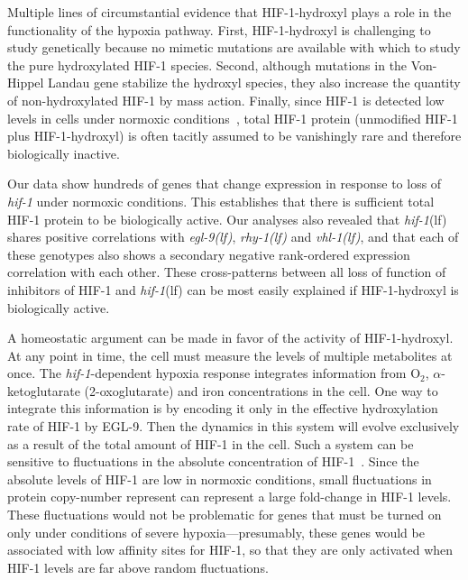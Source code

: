 \documentclass[9pt,twocolumn,twoside]{pnas-new}
\newcommand{\gene}[1]{\emph{#1}}
\newcommand{\egl}{\emph{\mbox{egl-9}(lf)}}
\newcommand{\rhy}{\emph{\mbox{rhy-1}(lf)}}
\newcommand{\vhl}{\emph{\mbox{vhl-1}(lf)}}
\newcommand{\hif}{\emph{\mbox{hif-1}}(lf)}
\newcommand{\eglp}{EGL-9}
\newcommand{\hifp}{HIF-1}
\begin{document}
Multiple lines of circumstantial evidence that \hifp{}-hydroxyl plays a role
in the functionality of the hypoxia pathway. First, \hifp{}-hydroxyl is
challenging to study genetically because no mimetic mutations are available with
which to study the pure hydroxylated \hifp{} species. Second, although mutations in
the Von-Hippel Landau gene stabilize the hydroxyl species, they also increase the
quantity of non-hydroxylated \hifp{} by mass action.
Finally, since \hifp{} is detected low levels
in cells under normoxic conditions~\cite{Wang1993}, total \hifp{} protein
(unmodified \hifp{} plus \hifp{}-hydroxyl) is often tacitly assumed to be
vanishingly rare and therefore biologically inactive.

Our data show hundreds of genes that change expression in response
to loss of \gene{hif-1} under normoxic conditions. This establishes that there is
sufficient total \hifp{} protein to be biologically active.
Our analyses also revealed that \hif{} shares
positive correlations with \egl{}, \rhy{} and \vhl{}, and that each of these genotypes
also shows a secondary negative rank-ordered expression correlation with each other.
These cross-patterns between all loss of function of inhibitors of \hifp{} and
\hif{} can be most easily explained if \hifp{}-hydroxyl is biologically active.

A homeostatic argument can be made in favor of the activity of \hifp{}-hydroxyl.
At any point in time, the cell must measure the levels of
multiple metabolites at once. The \gene{hif-1}-dependent hypoxia
response integrates information from O$_2$, $\alpha$-ketoglutarate
(2-oxoglutarate) and iron concentrations in the cell. One way to
integrate this information is by encoding it only in the effective hydroxylation
rate of \hifp{} by \eglp{}. Then the dynamics in this system will evolve
exclusively as a result of the total amount of \hifp{} in the cell. Such a system
can be sensitive to fluctuations in the absolute concentration of
\hifp{}~\cite{Goentoro2009a}. Since the absolute levels of \hifp{} are low in
normoxic conditions, small fluctuations in protein copy-number represent can
represent a large fold-change in \hifp{} levels. These fluctuations would
not be problematic for genes that must be turned on only under conditions of severe
hypoxia---presumably, these genes would be associated with low affinity
sites for \hifp{}, so that they are only activated when \hifp{} levels are far
above random fluctuations.
\end{document}

